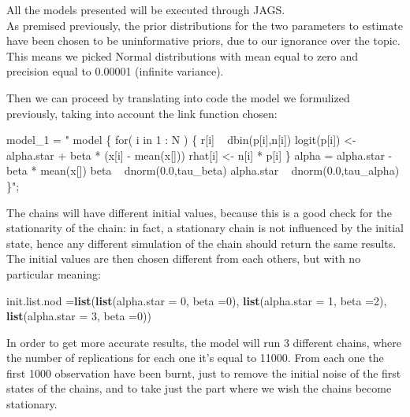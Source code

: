 \documentclass[]{article}
\newenvironment{Shaded}{\begin{snugshade}}{\end{snugshade}}
\newcommand{\DataTypeTok}[1]{\textcolor[rgb]{0.13,0.29,0.53}{#1}}
\newcommand{\DecValTok}[1]{\textcolor[rgb]{0.00,0.00,0.81}{#1}}
\newcommand{\KeywordTok}[1]{\textcolor[rgb]{0.13,0.29,0.53}{\textbf{#1}}}
\newcommand{\NormalTok}[1]{#1}
\newcommand{\StringTok}[1]{\textcolor[rgb]{0.31,0.60,0.02}{#1}}
\begin{document}
All the models presented will be executed through JAGS.\\
As premised previously, the prior distributions for the two parameters
to estimate have been chosen to be uninformative priors, due to our
ignorance over the topic. This means we picked Normal distributions with
mean equal to zero and precision equal to 0.00001 (infinite variance).

Then we can proceed by translating into code the model we formulized
previously, taking into account the link function chosen:

\begin{Shaded}
\begin{Highlighting}[]
\NormalTok{model_}\DecValTok{1}\NormalTok{ =}\StringTok{ "}
\StringTok{      model \{}
\StringTok{       for( i in 1 : N ) \{}
\StringTok{          r[i] ~ dbin(p[i],n[i])}
\StringTok{          logit(p[i]) <- alpha.star + beta * (x[i] - mean(x[]))}
\StringTok{          rhat[i] <- n[i] * p[i]}
\StringTok{       \}}
\StringTok{       alpha = alpha.star - beta * mean(x[])}
\StringTok{       beta ~ dnorm(0.0,tau_beta)}
\StringTok{       alpha.star ~ dnorm(0.0,tau_alpha)   }
\StringTok{    \}"}\NormalTok{;}
\end{Highlighting}
\end{Shaded}

The chains will have different initial values, because this is a good
check for the stationarity of the chain: in fact, a stationary chain is
not influenced by the initial state, hence any different simulation of
the chain should return the same results. The initial values are then
chosen different from each others, but with no particular meaning:

\begin{Shaded}
\begin{Highlighting}[]
\NormalTok{init.list.nod =}\KeywordTok{list}\NormalTok{(}\KeywordTok{list}\NormalTok{(}\DataTypeTok{alpha.star =} \DecValTok{0}\NormalTok{, }\DataTypeTok{beta =}\DecValTok{0}\NormalTok{),}
                    \KeywordTok{list}\NormalTok{(}\DataTypeTok{alpha.star =} \DecValTok{1}\NormalTok{, }\DataTypeTok{beta =}\DecValTok{2}\NormalTok{),}
                    \KeywordTok{list}\NormalTok{(}\DataTypeTok{alpha.star =} \DecValTok{3}\NormalTok{, }\DataTypeTok{beta =}\DecValTok{0}\NormalTok{))}
\end{Highlighting}
\end{Shaded}

In order to get more accurate results, the model will run 3 different
chains, where the number of replications for each one it's equal to
11000. From each one the first 1000 observation have been burnt, just to
remove the initial noise of the first states of the chains, and to take
just the part where we wish the chains become stationary.
\end{document}
